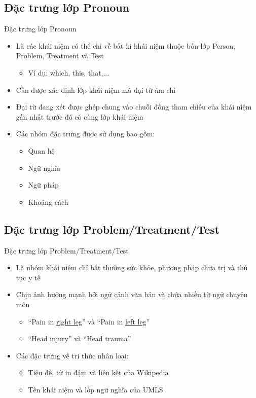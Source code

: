 \subsection{Đặc trưng lớp Pronoun}
\begin{frame}{Đặc trưng lớp Pronoun}
\putlogo
\begin{itemize}
	\item Là các khái niệm có thể chỉ về bất kì khái niệm thuộc bốn lớp Person, Problem, Treatment và Test
	\begin{itemize}
		\item Ví dụ: which, this, that,...
	\end{itemize}
	\item Cần được {\color{red} xác định lớp khái niệm} mà đại từ ám chỉ
	\item Đại từ đang xét được ghép chung vào chuỗi đồng tham chiếu của khái niệm gần nhất trước đó có cùng lớp khái niệm
	\item Các nhóm đặc trưng được sử dụng bao gồm:
	\begin{itemize}
		\item Quan hệ
		\item Ngữ nghĩa
		\item Ngữ pháp
		\item Khoảng cách
	\end{itemize}
\end{itemize}
\end{frame}

\subsection{Đặc trưng lớp Problem/Treatment/Test}
\begin{frame}{Đặc trưng lớp Problem/Treatment/Test}
\putlogo
\begin{itemize}
	\item Là nhóm khái niệm chỉ bất thường sức khỏe, phương pháp chữa trị và thủ tục y tế
	\item Chịu ảnh hưởng mạnh bởi {\color{red} ngữ cảnh văn bản} và chứa nhiều {\color{red} từ ngữ chuyên môn}
	\begin{itemize}
		\item ``Pain in \underline{right leg}'' và ``Pain in \underline{left leg}''
		\item ``Head injury'' và ``Head trauma''
	\end{itemize}
	\item Các đặc trưng về tri thức nhân loại:
	\begin{itemize}
		\item Tiêu đề, từ in đậm và liên kết của {\color{red} Wikipedia}
		\item Tên khái niệm và lớp ngữ nghĩa của {\color{red} UMLS}
	\end{itemize}
\end{itemize}
\end{frame}

